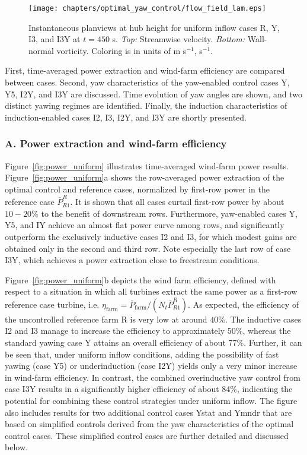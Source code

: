 	\begin{figure}
		\texttt{[image: chapters/optimal\_yaw\_control/flow\_field\_lam.eps]}
		\caption[Instantaneous planviews at hub height for uniform inflow cases R, Y, I3, and I3Y at $t= 450$ s.]{Instantaneous planviews at hub height for uniform inflow cases R, Y, I3, and I3Y at $t= 450$ s. \emph{Top: } Streamwise velocity. \emph{Bottom: } Wall-normal vorticity. Coloring is in units of m s$^{-1}$, s$^{-1}$. \label{fig:flowfield_uniform}}
	\end{figure}
	
	First, time-averaged power extraction and wind-farm efficiency are compared between cases. Second, yaw characteristics of the yaw-enabled control cases Y, Y5, I2Y, and I3Y are discussed. Time evolution of yaw angles are shown, and two distinct yawing regimes are identified. Finally, the induction characteristics of induction-enabled cases I2, I3, I2Y, and I3Y are shortly presented.
	
	\subsubsection{A. Power extraction and wind-farm efficiency}
	
	Figure~\ref{fig:power_uniform} illustrates time-averaged wind-farm power results. Figure~\ref{fig:power_uniform}a shows the row-averaged power extraction of the optimal control and reference cases, normalized by first-row power in the reference case $\overline{P}_{R1}^R$. It is shown that all cases curtail first-row power by about $10-20\%$ to the benefit of downstream rows. Furthermore, yaw-enabled cases Y, Y5, and IY achieve an almost flat power curve among rows, and significantly outperform the exclusively inductive cases I2 and I3, for which modest gains are obtained only in the second and third row. Note especially the last row of case I3Y, which achieves a power extraction close to freestream conditions.
	
	Figure~\ref{fig:power_uniform}b depicts the wind farm efficiency, defined with respect to a situation in which all turbines extract the same power as a first-row reference case turbine, i.e. $\eta_{\text{farm}} = \overline{P}_{\text{farm}}/(N_t \overline{P}_{R1}^{R})$. As expected, the efficiency of the uncontrolled reference farm R is very low at around $40\%$. The inductive cases I2 and I3 manage to increase the efficiency to approximately 50\%, whereas the standard yawing case Y attains an overall efficiency of about 77$\%$. Further, it can be seen that, under uniform inflow conditions, adding the possibility of fast yawing (case Y5) or underinduction (case I2Y) yields only a very minor increase in wind-farm efficiency. In contrast, the combined overinductive yaw control from case I3Y results in a significantly higher efficiency of about 84\%, indicating the potential for combining these control strategies under uniform inflow. The figure also includes results for two additional control cases Ystat and Ymndr that are based on simplified controls derived from the yaw characteristics of the optimal control cases. These simplified control cases are further detailed and discussed below.
	
